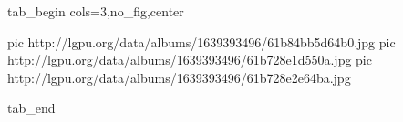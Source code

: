  
 
 
 
 


\ifcmt
  tab_begin cols=3,no_fig,center

     pic http://lgpu.org/data/albums/1639393496/61b84bb5d64b0.jpg
		 pic http://lgpu.org/data/albums/1639393496/61b728e1d550a.jpg
		 pic http://lgpu.org/data/albums/1639393496/61b728e2e64ba.jpg

  tab_end
\fi
